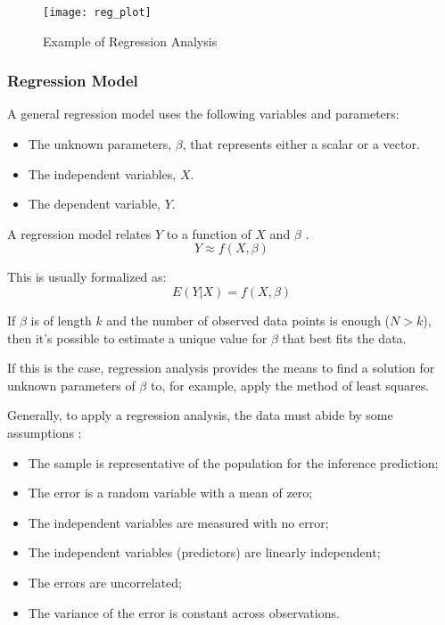 \begin{figure}[H]
	\centering
	\texttt{[image: reg\_plot]}
	\caption{Example of Regression Analysis}
	\label{fig:reg_plot}
\end{figure}	

\subsubsection*{Regression Model} 
A general regression model uses the following variables and parameters:
\begin{itemize}[noitemsep]
	\item The unknown parameters, $\beta$, that represents either a scalar or a vector.
	\item The independent variables, $X$. 
	\item The dependent variable, $Y$.
\end{itemize}

A regression model relates $Y$ to a function of $X$ and $\beta$ \cite{wiki:reg_an}.
\begin{equation}
	Y \approx f(X,\beta)
\end{equation}

This is usually formalized as:
\begin{equation}
	E(Y|X) = f(X,\beta)
\end{equation}

If $\beta$ is of length $k$ and the number of observed data points is enough ($N > k$), then it's possible to estimate a unique value for $\beta$ that best fits the data.

If this is the case, regression analysis provides the means to find a solution for unknown parameters of $\beta$ to, for example, apply the method of least squares.

Generally, to apply a regression analysis, the data must abide by some assumptions \cite{wiki:lin_reg}:
\begin{itemize}[noitemsep, topsep = -5pt]
	\item The sample is representative of the population for the inference prediction;
	\item The error is a random variable with a mean of zero;
	\item The independent variables are measured with no error;
	\item The independent variables (predictors) are linearly independent;
	\item The errors are uncorrelated;
	\item The variance of the error is constant across observations.
\end{itemize}

